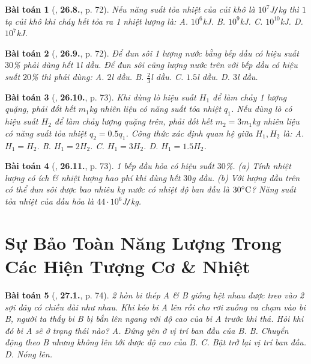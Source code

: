 \documentclass{article}
\numberwithin{equation}{section}
\newtheorem{baitoan}{Bài toán}
\begin{document}
\begin{baitoan}[\cite{SBT_Vat_Ly_8}, \textbf{26.8.}, p. 72]
	Nếu năng suất tỏa nhiệt của củi khô là $10^7$\emph{J\texttt{/}kg} thì $1$ tạ củi khô khi cháy hết tỏa ra 1 nhiệt lượng là: {\sf A.} $10^6$\emph{kJ}. {\sf B.} $10^9$\emph{kJ}. {\sf C.} $10^{10}$\emph{kJ}. {\sf D.} $10^7$\emph{kJ}.
\end{baitoan}

\begin{baitoan}[\cite{SBT_Vat_Ly_8}, \textbf{26.9.}, p. 72]
	Để đun sôi 1 lượng nước bằng bếp dầu có hiệu suất $30$\% phải dùng hết $1$\emph{l} dầu. Để đun sôi cũng lượng nước trên với bếp dầu có hiệu suất $20$\% thì phải dùng: {\sf A.} $2$\emph{l} dầu. {\sf B.} $\frac{2}{3}$\emph{l} dầu. {\sf C.} $1.5$\emph{l} dầu. {\sf D.} $3$\emph{l} dầu.
\end{baitoan}

\begin{baitoan}[\cite{SBT_Vat_Ly_8}, \textbf{26.10.}, p. 73]
	Khi dùng lò hiệu suất $H_1$ để làm chảy 1 lượng quặng, phải đốt hết $m_1$\emph{kg} nhiên liệu có năng suất tỏa nhiệt $q_1$. Nếu dùng lò có hiệu suất $H_2$ để làm chảy lượng quặng trên, phải đốt hết $m_2 = 3m_1$\emph{kg} nhiên liệu có năng suất tỏa nhiệt $q_2 = 0.5q_1$. Công thức xác định quan hệ giữa $H_1,H_2$ là: {\sf A.} $H_1 = H_2$. {\sf B.} $H_1 = 2H_2$. {\sf C.} $H_1 = 3H_2$. {\sf D.} $H_1 = 1.5H_2$.
\end{baitoan}

\begin{baitoan}[\cite{SBT_Vat_Ly_8}, \textbf{26.11.}, p. 73]
	1 bếp dầu hỏa có hiệu suất $30$\%. (a) Tính nhiệt lượng có ích \& nhiệt lượng hao phí khi dùng hết $30$\emph{g} dầu. (b) Với lượng dầu trên có thể đun sôi được bao nhiêu \emph{kg} nước có nhiệt độ ban đầu là $30^\circ{\rm C}$? Năng suất tỏa nhiệt của dầu hỏa là $44\cdot10^6$\emph{J\texttt{/}kg}.
\end{baitoan}


\section{Sự Bảo Toàn Năng Lượng Trong Các Hiện Tượng Cơ \& Nhiệt}

\begin{baitoan}[\cite{SBT_Vat_Ly_8}, \textbf{27.1.}, p. 74]
	2 hòn bi thép A \& B giống hệt nhau được treo vào 2 sợi dây có chiều dài như nhau. Khi kéo bi A lên rồi cho rơi xuống va chạm vào bi B, người ta thấy bi B bị bắn lên ngang với độ cao của bi A trước khi thả. Hỏi khi đó bi A sẽ ở trạng thái nào? {\sf A.} Đứng yên ở vị trí ban đầu của B. {\sf B.} Chuyển động theo B nhưng không lên tới được độ cao của B. {\sf C.} Bật trở lại vị trí ban đầu. {\sf D.} Nóng lên.
\end{baitoan}
\end{document}

